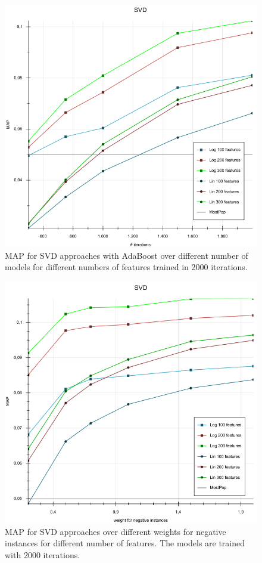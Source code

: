 \documentclass[10pt]{reportMaster}
\begin{document}
\begin{figure}
	\centering
	\includegraphics[width=1\textwidth]{figures/experiments/SVDModels}
	\caption{MAP for SVD approaches with AdaBoost over different number of models for different numbers of features trained in 2000 iterations.}
	\label{fig:SVDModels}
\end{figure}


\begin{figure}
	\centering
	\includegraphics[width=1\textwidth]{figures/experiments/SVDWeights}
	\caption{MAP for SVD approaches over different weights for negative instances for different number of features. The models are trained with 2000 iterations.}
	\label{fig:SVDWeights}
\end{figure}
\end{document}
